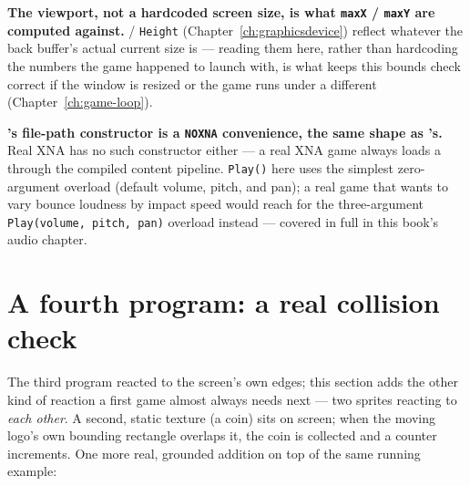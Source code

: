 \textbf{The viewport, not a hardcoded screen size, is what \texttt{maxX} / \texttt{maxY} are
computed against.}  / \texttt{Height} (Chapter~\ref{ch:graphicsdevice})
reflect whatever the back buffer's actual current size is --- reading them here, rather than
hardcoding the numbers the game happened to launch with, is what keeps this bounds check
correct if the window is resized or the game runs under a different
 (Chapter~\ref{ch:game-loop}).

\textbf{'s file-path constructor is a \texttt{NOXNA} convenience, the
same shape as 's.} Real XNA has no such constructor either --- a real XNA
game always loads a  through the compiled content pipeline. \texttt{Play()}
here uses the simplest zero-argument overload (default volume, pitch, and pan); a real game
that wants to vary bounce loudness by impact speed would reach for the three-argument
\texttt{Play(volume, pitch, pan)} overload instead --- covered in full in this book's audio
chapter.

\section{A fourth program: a real collision check}

The third program reacted to the screen's own edges; this section adds the other kind of
reaction a first game almost always needs next --- two sprites reacting to \emph{each other}.
A second, static texture (a coin) sits on screen; when the moving logo's own bounding rectangle
overlaps it, the coin is collected and a counter increments. One more real, grounded addition
on top of the same running example:

